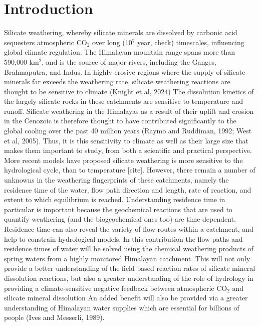 
\section{Introduction}



Silicate weathering, whereby silicate minerals are dissolved by carbonic acid 
sequesters atmospheric CO$_2$ over long (10$^7$ year, check) timescales, influencing global climate regulation.
The Himalayan mountain range spans more than 590,000 km$^2$, and is the source of major rivers, including the Ganges, Brahmaputra, and Indus. In highly erosive regions where the supply of silicate minerals far exceeds the weathering rate, silicate weathering reactions are thought to be sensitive to climate (Knight et al, 2024) The dissolution kinetics of the largely silicate rocks in these catchments are sensitive to temperature and runoff. Silicate weathering in the Himalayas as a result of their uplift and erosion in the Cenozoic is therefore thought to have contributed significantly to the global 
cooling over the past 40 million years %
(Raymo and Ruddiman, 1992; West et al, 2005). 
Thus, it is this sensitivity to climate as well as their large size that makes them important to study, from both a scientific and practical perspective. More recent models have proposed silicate weathering is more sensitive to the hydrological cycle, than to temperature [cite].
However, there remain a number of unknowns in the weathering fingerprints of these catchments, namely the residence time of the water,
flow path direction and length, rate of reaction, and extent to which equilibrium is reached.
Understanding residence time in particular is important because the geochemical reactions that are used to quantify weathering 
(and the biogeochemical ones too) are time-dependent.
Residence time can also reveal the variety of flow routes within a catchment, and help to constrain hydrological models. In this contribution the flow paths and residence times of water will be solved using the chemical weathering products of spring waters from a highly monitored Himalayan catchment. This will not only provide a better understanding of the field based reaction rates of silicate mineral dissolution reactions, but also a greater understanding of the role of hydrology in providing a climate-sensitive negative feedback between atmospheric CO$_2$ and silicate mineral dissolution
An added benefit will also be provided via a greater understanding of Himalayan water supplies which are essential for billions of people (Ives and Messerli, 1989). 


